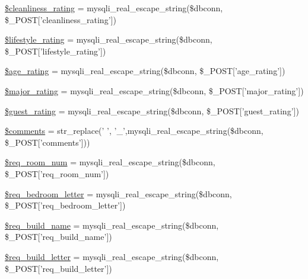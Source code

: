 \begin{DoxyCompactItemize}
\hyperlink{user__view_2validate_2studentVal_8php_aa181e44821f174a8b2551d5c30c03c1d}{\$cleanliness\-\_\-rating} = mysqli\-\_\-real\-\_\-escape\-\_\-string(\$dbconn, \$\-\_\-\-P\-O\-S\-T\mbox{[}'cleanliness\-\_\-rating'\mbox{]})
\item 
\hyperlink{user__view_2validate_2studentVal_8php_aeaacae1f81e4a03e1332c1e322315730}{\$lifestyle\-\_\-rating} = mysqli\-\_\-real\-\_\-escape\-\_\-string(\$dbconn, \$\-\_\-\-P\-O\-S\-T\mbox{[}'lifestyle\-\_\-rating'\mbox{]})
\item 
\hyperlink{user__view_2validate_2studentVal_8php_a69122fb82424ff3bb0780b56f8bc8e6d}{\$age\-\_\-rating} = mysqli\-\_\-real\-\_\-escape\-\_\-string(\$dbconn, \$\-\_\-\-P\-O\-S\-T\mbox{[}'age\-\_\-rating'\mbox{]})
\item 
\hyperlink{user__view_2validate_2studentVal_8php_a658e327f04cd3d91c4a064f7f496ccef}{\$major\-\_\-rating} = mysqli\-\_\-real\-\_\-escape\-\_\-string(\$dbconn, \$\-\_\-\-P\-O\-S\-T\mbox{[}'major\-\_\-rating'\mbox{]})
\item 
\hyperlink{user__view_2validate_2studentVal_8php_ade1951cffb40e000076f5d81e34e41d8}{\$guest\-\_\-rating} = mysqli\-\_\-real\-\_\-escape\-\_\-string(\$dbconn, \$\-\_\-\-P\-O\-S\-T\mbox{[}'guest\-\_\-rating'\mbox{]})
\item 
\hyperlink{user__view_2validate_2studentVal_8php_a35e8cdeb473a5eb016fea893d14de951}{\$comments} = str\-\_\-replace(' ', '\-\_\-',mysqli\-\_\-real\-\_\-escape\-\_\-string(\$dbconn, \$\-\_\-\-P\-O\-S\-T\mbox{[}'comments'\mbox{]}))
\item 
\hyperlink{user__view_2validate_2studentVal_8php_a03ada09603995a51dc132367698e687d}{\$req\-\_\-room\-\_\-num} = mysqli\-\_\-real\-\_\-escape\-\_\-string(\$dbconn, \$\-\_\-\-P\-O\-S\-T\mbox{[}'req\-\_\-room\-\_\-num'\mbox{]})
\item 
\hyperlink{user__view_2validate_2studentVal_8php_adab4b11b8fdbb9622f5c281bcdcc8c5d}{\$req\-\_\-bedroom\-\_\-letter} = mysqli\-\_\-real\-\_\-escape\-\_\-string(\$dbconn, \$\-\_\-\-P\-O\-S\-T\mbox{[}'req\-\_\-bedroom\-\_\-letter'\mbox{]})
\item 
\hyperlink{user__view_2validate_2studentVal_8php_ab1174bbcff9467a38d45e4938ed53d0c}{\$req\-\_\-build\-\_\-name} = mysqli\-\_\-real\-\_\-escape\-\_\-string(\$dbconn, \$\-\_\-\-P\-O\-S\-T\mbox{[}'req\-\_\-build\-\_\-name'\mbox{]})
\item 
\hyperlink{user__view_2validate_2studentVal_8php_ad5410bee895d3866331bed8468ce1a49}{\$req\-\_\-build\-\_\-letter} = mysqli\-\_\-real\-\_\-escape\-\_\-string(\$dbconn, \$\-\_\-\-P\-O\-S\-T\mbox{[}'req\-\_\-build\-\_\-letter'\mbox{]})

\end{DoxyCompactItemize}
